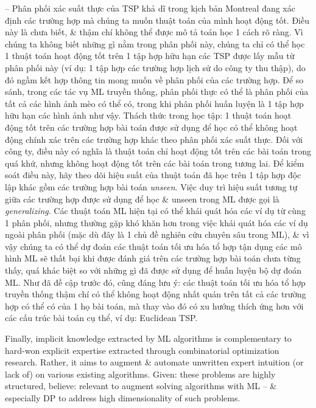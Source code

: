 \documentclass{article}
\begin{document}
\begin{itemize}
\begin{itemize}
        -- Phân phối xác suất thực của TSP khả dĩ trong kịch bản Montreal đang xác định các trường hợp mà chúng ta muốn thuật toán của mình hoạt động tốt. Điều này là chưa biết, \& thậm chí không thể được mô tả toán học 1 cách rõ ràng. Vì chúng ta không biết những gì nằm trong phân phối này, chúng ta chỉ có thể học 1 thuật toán hoạt động tốt trên 1 tập hợp hữu hạn các TSP được lấy mẫu từ phân phối này (ví dụ: 1 tập hợp các trường hợp lịch sử do công ty thu thập), do đó ngầm kết hợp thông tin mong muốn về phân phối của các trường hợp. Để so sánh, trong các tác vụ ML truyền thống, phân phối thực có thể là phân phối của tất cả các hình ảnh mèo có thể có, trong khi phân phối huấn luyện là 1 tập hợp hữu hạn các hình ảnh như vậy. Thách thức trong học tập: 1 thuật toán hoạt động tốt trên các trường hợp bài toán được sử dụng để học có thể không hoạt động chính xác trên các trường hợp khác theo phân phối xác suất thực. Đối với công ty, điều này có nghĩa là thuật toán chỉ hoạt động tốt trên các bài toán trong quá khứ, nhưng không hoạt động tốt trên các bài toán trong tương lai. Để kiểm soát điều này, hãy theo dõi hiệu suất của thuật toán đã học trên 1 tập hợp độc lập khác gồm các trường hợp bài toán {\it unseen}. Việc duy trì hiệu suất tương tự giữa các trường hợp được sử dụng để học \& unseen trong ML được gọi là {\it generalizing}. Các thuật toán ML hiện tại có thể khái quát hóa các ví dụ từ cùng 1 phân phối, nhưng thường gặp khó khăn hơn trong việc khái quát hóa các ví dụ ngoài phân phối (mặc dù đây là 1 chủ đề nghiên cứu chuyên sâu trong ML), \& vì vậy chúng ta có thể dự đoán các thuật toán tối ưu hóa tổ hợp tận dụng các mô hình ML sẽ thất bại khi được đánh giá trên các trường hợp bài toán chưa từng thấy, quá khác biệt so với những gì đã được sử dụng để huấn luyện bộ dự đoán ML. Như đã đề cập trước đó, cũng đáng lưu ý: các thuật toán tối ưu hóa tổ hợp truyền thống thậm chí có thể không hoạt động nhất quán trên tất cả các trường hợp có thể có của 1 họ bài toán, mà thay vào đó có xu hướng thích ứng hơn với các cấu trúc bài toán cụ thể, ví dụ: Euclidean TSP.

        Finally, implicit knowledge extracted by ML algorithms is complementary to hard-won explicit expertise extracted through combinatorial optimization research. Rather, it aims to augment \& automate unwritten expert intuition (or lack of) on various existing algorithms. Given: these problems are highly structured, believe: relevant to augment solving algorithms with ML -- \& especially DP to address high dimensionality of such problems.


\end{itemize}
\end{itemize}
\end{document}
